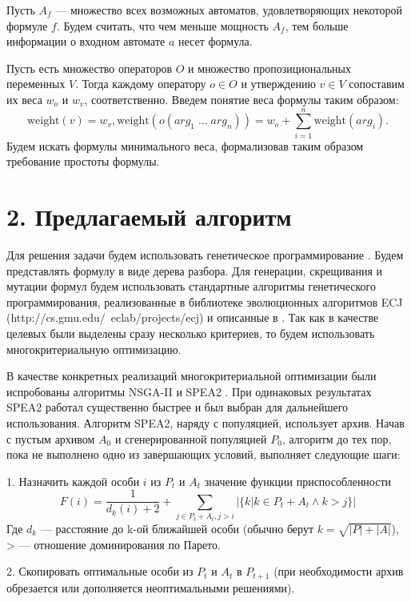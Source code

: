 \documentclass[12pt,fleqn]{article}
\begin{document}
Пусть $A_f$ --- множество всех возможных автоматов, удовлетворяющих некоторой формуле $f$. Будем считать,
что чем меньше мощность $A_f$, тем больше информации о входном автомате $a$ несет формула.

Пусть есть множество операторов $O$ и множество пропозициональных переменных $V$.
Тогда каждому оператору $o \in O$ и утверждению $v \in V$ сопоставим их веса $w_o$ и $w_v$, соответственно.
Введем понятие веса формулы таким образом:
\begin{equation*}
\text{weight}(v) = w_v, \text{weight}(o(arg_1\; \ldots \; arg_n)) = w_o + \sum_{i=1}^{n}\text{weight}(arg_i).
\end{equation*}
Будем искать формулы минимального веса, формализовав таким образом требование простоты формулы.

\section{2. Предлагаемый алгоритм}

Для решения задачи будем использовать генетическое программирование \cite{kz1}. Будем представлять формулу в виде дерева разбора.
Для генерации, скрещивания и мутации формул будем использовать стандартные алгоритмы генетического программирования,
реализованные в библиотеке эволюционных алгоритмов ECJ (http://cs.gmu.edu/~eclab/projects/ecj) и описанные в \cite{kz1, kz2}.
Так как в качестве целевых были выделены сразу несколько критериев, то будем использовать многокритериальную оптимизацию.

В качестве конкретных реализаций многокритериальной оптимизации были испробованы алгоритмы NSGA-II \cite{nsga2} и SPEA2 \cite{spea2}.
При одинаковых результатах SPEA2 работал существенно быстрее и был выбран для дальнейшего использования. Алгоритм SPEA2,
наряду с популяцией, использует архив. Начав с пустым архивом $A_0$ и сгенерированной популяцией $P_0$, алгоритм до
тех пор, пока не выполнено одно из завершающих условий, выполняет следующие шаги: 

1. Назначить каждой особи $i$ из $P_t$ и $A_t$ значение функции приспособленности
$$
F(i) = \frac{1}{d_k(i) + 2} + \sum_{j\in P_t + A_t, j > i}|\{k|k \in P_t + A_t \wedge k > j\}|
$$
Где $d_k$ --- расстояние до k-ой ближайшей особи (обычно берут $k = \sqrt{|P| + |A|}$), > --- отношение доминирования по Парето.

2. Скопировать оптимальные особи из $P_t$ и $A_t$ в $P_{t+1}$ (при необходимости архив обрезается или дополняется неоптимальными решениями).
\end{document}
